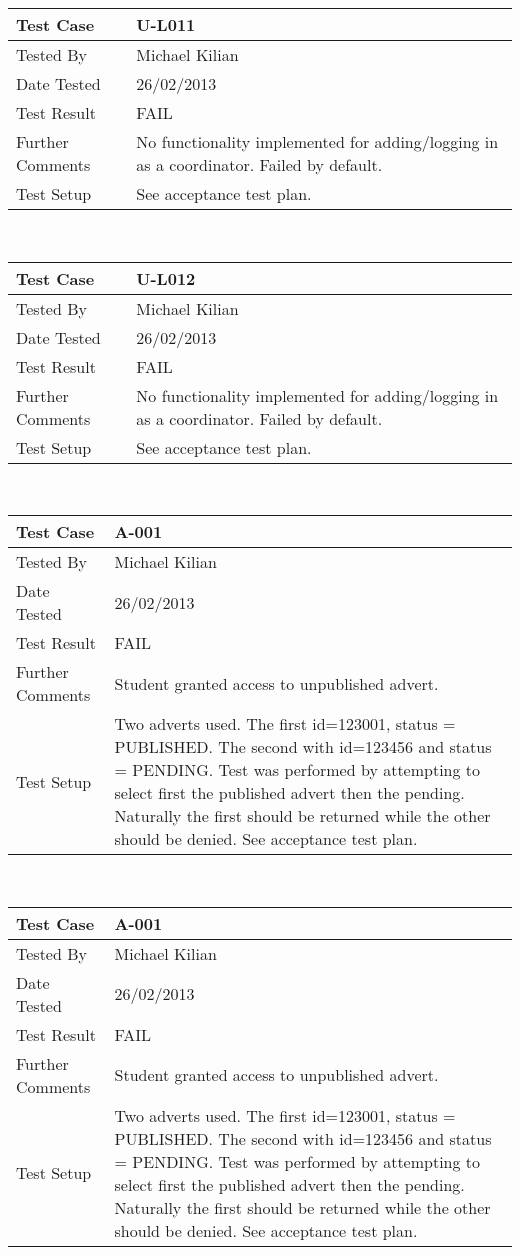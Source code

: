 \documentclass{l3deliverable}
\begin{document}
\begin{tabular}{lp{10cm}}
\hline 
\textbf{Test Case} & U-L011\tabularnewline
\hline 
\hline 
Tested By & Michael Kilian\tabularnewline
\hline 
Date Tested & 26/02/2013\tabularnewline
\hline 
Test Result & FAIL\tabularnewline
\hline
Further Comments &  No functionality implemented for adding/logging in as a coordinator. Failed by default. \tabularnewline
\hline
Test Setup &  See acceptance test plan. \tabularnewline
\hline
\end{tabular}\\

\begin{tabular}{lp{10cm}}
\hline 
\textbf{Test Case} & U-L012\tabularnewline
\hline 
\hline 
Tested By & Michael Kilian\tabularnewline
\hline 
Date Tested & 26/02/2013\tabularnewline
\hline 
Test Result & FAIL\tabularnewline
\hline
Further Comments &  No functionality implemented for adding/logging in as a coordinator. Failed by default. \tabularnewline
\hline
Test Setup &  See acceptance test plan. \tabularnewline
\hline
\end{tabular}\\

\begin{tabular}{lp{10cm}}
\hline 
\textbf{Test Case} & A-001\tabularnewline
\hline 
\hline 
Tested By & Michael Kilian\tabularnewline
\hline 
Date Tested & 26/02/2013\tabularnewline
\hline 
Test Result & FAIL\tabularnewline
\hline
Further Comments &  Student granted access to unpublished advert. \tabularnewline
\hline
Test Setup &  Two adverts used. The first id=123001, status = PUBLISHED. The second with id=123456 and status = PENDING. Test was performed by attempting to select first the published advert then the pending. Naturally the first should be returned while the other should be denied. See acceptance test plan. \tabularnewline
\hline
\end{tabular}\\

\begin{tabular}{lp{10cm}}
\hline 
\textbf{Test Case} & A-001\tabularnewline
\hline 
\hline 
Tested By & Michael Kilian\tabularnewline
\hline 
Date Tested & 26/02/2013\tabularnewline
\hline 
Test Result & FAIL\tabularnewline
\hline
Further Comments &  Student granted access to unpublished advert. \tabularnewline
\hline
Test Setup &  Two adverts used. The first id=123001, status = PUBLISHED. The second with id=123456 and status = PENDING. Test was performed by attempting to select first the published advert then the pending. Naturally the first should be returned while the other should be denied. See acceptance test plan. \tabularnewline
\hline
\end{tabular}\\
\end{document}
